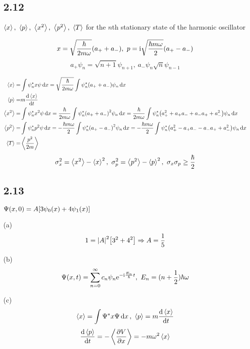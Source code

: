 \subsection{2.12}
$\expval{x},\ \expval{p},\ \expval{x^2},\ \expval{p^2},\ \expval{T}$ for the $n$th stationary state of the harmonic oscillator
\begin{framed}
    \[
        x = \sqrt{\frac{\hbar}{2 m \omega}} \qty(a_+ + a_-),\
        p = \mathrm{i} \sqrt{\frac{\hbar m \omega}{2}} \qty(a_+ - a_-)
    \] \[
        a_+ \psi_n = \sqrt{n + 1} \psi_{n + 1},\ a_- \psi_n \sqrt{n} \psi_{n - 1}
    \]

    \begin{align*}
        \expval{x} =   & \int \psi_n^* x \psi \dd{x} = \sqrt{\frac{\hbar}{2 m \omega}} \int \psi_n^* \qty(a_+ + a_-) \psi_n \dd{x}                                                                                                \\
        \expval{p} =   & m \dv{\expval{x}}{t}                                                                                                                                                                                     \\
        \expval{x^2} = & \int \psi_n^* x^2 \psi \dd{x} = \frac{\hbar}{2 m \omega} \int \psi_n^* \qty(a_+ + a_-)^2 \psi_n \dd{x} = \frac{\hbar}{2 m \omega} \int \psi_n^* \qty(a_+^2 + a_+ a_- + a_- a_+ +a_-^2) \psi_n \dd{x}     \\
        \expval{p^2} = & \int \psi_n^* p^2 \psi \dd{x} = - \frac{\hbar m \omega}{2} \int \psi_n^* \qty(a_+ - a_-)^2 \psi_n \dd{x} = - \frac{\hbar m \omega}{2} \int \psi_n^* \qty(a_+^2 - a_+ a_- - a_- a_+ +a_-^2) \psi_n \dd{x} \\
        \expval{T} =   & \expval{\frac{p^2}{2 m}}
    \end{align*} \[
        \sigma_x^2 = \expval{x^2} - \expval{x}^2,\ \sigma_p^2 = \expval{p^2} - \expval{p}^2,\ \sigma_x \sigma_p \geq \frac{\hbar}{2}
    \]
\end{framed}

\subsection{2.13}
$\Psi(x, 0) = A \qty[3 \psi_0(x) + 4 \psi_1(x)]$
\begin{framed}
    (a)
    \[
        1 = \qty|A|^2 \qty[3^2 + 4^2] \Rightarrow A = \frac{1}{5}
    \]

    (b)
    \[
        \Psi(x, t) = \sum_{n = 0}^{\infty} c_n \psi_n \mathrm{e}^{- \mathrm{i} \frac{E_n}{\hbar} t},\ E_n = (n + \frac{1}{2}) \hbar \omega
    \]

    (c)
    \[
        \expval{x} = \int \Psi^* x \Psi \dd{x},\ \expval{p} = m \dv{\expval{x}}{t}
    \] \[
        \dv{\expval{p}}{t} = - \expval{\pdv{V}{x}} = - m \omega^2 \expval{x}
    \]
\end{framed}

